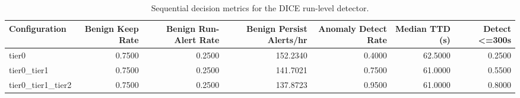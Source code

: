 \begin{table}[t]
\centering
\caption{Sequential decision metrics for the DICE run-level detector.}
\label{tab:dice_sequential_metrics}
\footnotesize
\begin{tabular}{lrrrrrr}
\toprule
Configuration & Benign Keep Rate & Benign Run-Alert Rate & Benign Persist Alerts/hr & Anomaly Detect Rate & Median TTD (s) & Detect <=300s \\
\midrule
tier0 & 0.7500 & 0.2500 & 152.2340 & 0.4000 & 62.5000 & 0.2500 \\
tier0_tier1 & 0.7500 & 0.2500 & 141.7021 & 0.7500 & 61.0000 & 0.5500 \\
tier0_tier1_tier2 & 0.7500 & 0.2500 & 137.8723 & 0.9500 & 61.0000 & 0.8000 \\
\bottomrule
\end{tabular}

\end{table}
